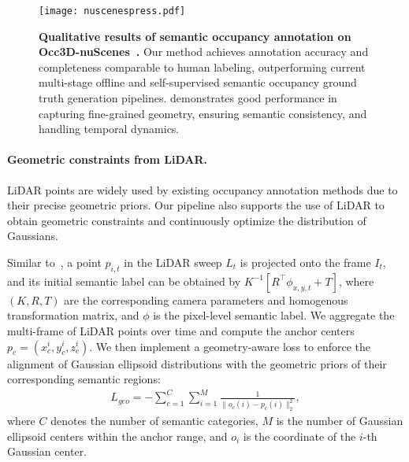 \begin{figure*}[ht]
  \centering
  \texttt{[image: nuscenespress.pdf]}
  \vspace{-2mm}
  \caption{\textbf{Qualitative results of semantic occupancy annotation on Occ3D-nuScenes~\cite{tian2024occ3d}.} Our method achieves annotation accuracy and completeness comparable to human labeling, outperforming current multi-stage offline and self-supervised semantic occupancy ground truth generation pipelines. \ourmethod{} demonstrates good performance in capturing fine-grained geometry, ensuring semantic consistency, and handling temporal dynamics.}
  \label{figure:compare}
  \afterfig
 \end{figure*}



 


\vspace{-4mm}
\paragraph{Geometric constraints from LiDAR.}
LiDAR points are widely used by existing occupancy annotation methods due to their precise geometric priors. Our pipeline also supports the use of LiDAR to obtain geometric constraints and continuously optimize the distribution of Gaussians.

Similar to~\cite{zhao2020fusion, zhao2023lif}, a point $p_{i,t}$ in the LiDAR sweep $L_t$ is projected onto the frame $I_t$, and its initial semantic label can be obtained by $K^{-1}[R^\top \phi_{x,y,t} + T]$, where $(K, R, T)$ are the corresponding camera parameters and homogenous transformation matrix, and $\phi$ is the pixel-level semantic label.
We aggregate the multi-frame of LiDAR points over time and compute the anchor centers $p_c = (x_c^i, y_c^i, z_c^i)$. We then implement a geometry-aware loss to enforce the alignment of Gaussian ellipsoid distributions with the geometric priors of their corresponding semantic regions:
\begin{equation}
\begin{aligned}
    L_{geo} = -\sum_{c=1}^{C} \sum_{i=1}^{M} \frac{1}{\| o_c(i) - p_c(i) \|_{2}^{2}} ,
\end{aligned}
\end{equation}
where $C$ denotes the number of semantic categories, $M$ is the number of Gaussian ellipsoid centers within the anchor range, and $o_i$ is the coordinate of the $i$-th Gaussian center.
%


\vspace{-4mm}
